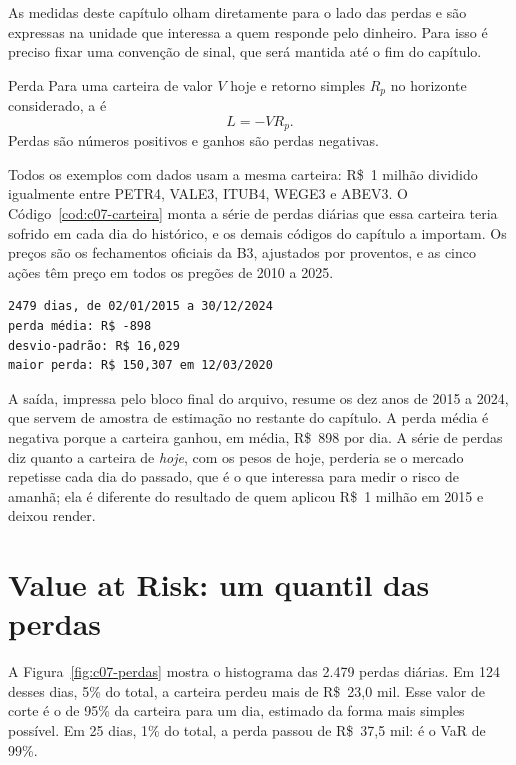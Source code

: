 As medidas deste capítulo olham diretamente para o lado das perdas e são expressas na unidade que interessa a quem responde pelo dinheiro. Para isso é preciso fixar uma convenção de sinal, que será mantida até o fim do capítulo.

\begin{definicao}{Perda}
Para uma carteira de valor $V$ hoje e retorno simples $R_p$ no horizonte considerado, a  é
\begin{equation}
  L = -V R_p .
  \label{eq:c07-perda}
\end{equation}
Perdas são números positivos e ganhos são perdas negativas.
\end{definicao}

Todos os exemplos com dados usam a mesma carteira: R\$~1 milhão dividido igualmente entre PETR4, VALE3, ITUB4, WEGE3 e ABEV3. O Código~\ref{cod:c07-carteira} monta a série de perdas diárias que essa carteira teria sofrido em cada dia do histórico, e os demais códigos do capítulo a importam. Os preços são os fechamentos oficiais da B3, ajustados por proventos, e as cinco ações têm preço em todos os pregões de 2010 a 2025.


\begin{lstlisting}[style=saida]
2479 dias, de 02/01/2015 a 30/12/2024
perda média: R$ -898
desvio-padrão: R$ 16,029
maior perda: R$ 150,307 em 12/03/2020
\end{lstlisting}

A saída, impressa pelo bloco final do arquivo, resume os dez anos de 2015 a 2024, que servem de amostra de estimação no restante do capítulo. A perda média é negativa porque a carteira ganhou, em média, R\$~898 por dia. A série de perdas diz quanto a carteira de \emph{hoje}, com os pesos de hoje, perderia se o mercado repetisse cada dia do passado, que é o que interessa para medir o risco de amanhã; ela é diferente do resultado de quem aplicou R\$~1 milhão em 2015 e deixou render.

\section{Value at Risk: um quantil das perdas}

A Figura~\ref{fig:c07-perdas} mostra o histograma das 2.479 perdas diárias. Em 124 desses dias, 5\% do total, a carteira perdeu mais de R\$~23,0 mil. Esse valor de corte é o  de 95\% da carteira para um dia, estimado da forma mais simples possível. Em 25 dias, 1\% do total, a perda passou de R\$~37,5 mil: é o VaR de 99\%.

